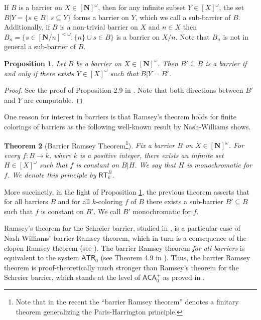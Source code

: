 \documentclass{amsart}
\theoremstyle{plain}
\theoremstyle{plain}
\newtheorem{theorem}{Theorem}
\newtheorem{proposition}[theorem]{Proposition}
\newcommand{\om}{\omega}
\newcommand\Nat{\mathbf{N}}
\newcommand\ACA{\mathsf{ACA}}
\newcommand\ATR{\mathsf{ATR}}
\newcommand\RT{\mathsf{RT}}
\begin{document}
If $B$ is a barrier on $X\in [\Nat]^\om$, then for any infinite subset $Y \in [X]^\om$, the set $B\vert Y = \{s \in B~\vert~s \subseteq Y \}$ forms a barrier on $Y$, which we call a sub-barrier of $B$. 
Additionally, if $B$ is a non-trivial barrier on $X$ and $n\in X$ then $B_n =\{s \in [\Nat/n]^{<\om}  :  \{n\}\cup s \in B\}$ is a barrier on $X/n$. 
Note that $B_n$ is not in general a sub-barrier of $B$.


\begin{proposition}\label{prop:sub_bar}
Let $B$ be a barrier on $X\in [\Nat]^\om$. Then $B' \subseteq B$ is a barrier if and only if there exists $Y \in [X]^\om$ such that
$B\vert Y = B'$.
\end{proposition}

\begin{proof}
See the proof of Proposition 2.9 in \cite{carroy_pequignot_2014}. Note that both directions between $B'$ and $Y$ are computable.
\end{proof}

One reason for interest in barriers is that Ramsey's theorem holds for finite colorings of barriers as the following well-known result by Nash-Williams \cite{nash-williams1968better} shows.

\begin{theorem}[Barrier Ramsey Theorem\footnote{Note that in the recent \cite{marcone_montalban_volpi_25} the “barrier Ramsey theorem” denotes a finitary theorem generalizing the Paris-Harrington principle.}]
Fix a barrier $B$ on $X\in [\Nat]^\omega$. For every $f: B \to k$, where $k$ is a positive integer, there exists an infinite set $H\in [X]^\omega$ such that $f$ is constant on $B\vert H$. We say that $H$ is monochromatic for $f$. We denote this principle by $\RT^B_k$.
\end{theorem}

More succinctly, in the light of Proposition \ref{prop:sub_bar}, the previous theorem asserts that for all barriers $B$ and for all $k$-coloring $f$ of $B$ there exists a sub-barrier $B'\subseteq B$ such that
$f$ is constant on $B'$. We call $B'$ monochromatic for $f$.

Ramsey's theorem for the Schreier barrier, studied in \cite{carlucci2014strength}, is a particular case of Nash-Williams' barrier Ramsey theorem, which in turn is a consequence of the clopen Ramsey theorem (see \cite{SIM:SOSOA}). 
The barrier Ramsey theorem {\em for all barriers} is equivalent to the system $\ATR_0$ (see Theorem 4.9 in \cite{marcone2005wqo}). Thus, the barrier Ramsey theorem is proof-theoretically much stronger than Ramsey's theorem for the Schreier barrier, which stands at the level of $\ACA_0^+$ as proved in \cite{carlucci2014strength}.
\end{document}
